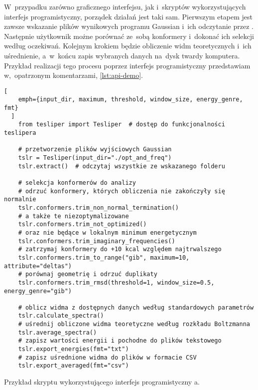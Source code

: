 W~przypadku zarówno graficznego interfejsu, jak i~skryptów wykorzystujących interfejs
  programistyczny, porządek działań jest taki sam.
Pierwszym etapem jest zawsze wskazanie plików wynikowych programu Gaussian i~ich odczytanie
  przez \tesliper{}.
Następnie użytkownik możne porównać ze~sobą konformery i~dokonać ich selekcji według oczekiwań.
Kolejnym krokiem będzie obliczenie widm teoretycznych i~ich uśrednienie, a~w~końcu zapis
  wybranych danych na~dysk twardy komputera.
Przykład realizacji tego procesu poprzez interfejs programistyczny przedstawiam
  w,~opatrzonym komentarzami, \cref{lst:api-demo}.

\begin{listing*}
  \begin{lstlisting}[
    emph={input_dir, maximum, threshold, window_size, energy_genre, fmt}
  ]
    from tesliper import Tesliper  # dostęp do funkcjonalności teslipera
    
    # przetworzenie plików wyjściowych Gaussian
    tslr = Tesliper(input_dir="./opt_and_freq")
    tslr.extract()  # odczytaj wszystkie ze wskazanego folderu
    
    # selekcja konformerów do analizy
    # odrzuć konformery, których obliczenia nie zakończyły się normalnie
    tslr.conformers.trim_non_normal_termination()
    # a także te niezoptymalizowane
    tslr.conformers.trim_not_optimized()
    # oraz nie będące w lokalnym minimum energetycznym
    tslr.conformers.trim_imaginary_frequencies()
    # zatrzymaj konformery do +10 kcal względem najtrwalszego
    tslr.conformers.trim_to_range("gib", maximum=10, attribute="deltas")
    # porównaj geometrię i odrzuć duplikaty
    tslr.conformers.trim_rmsd(threshold=1, window_size=0.5, energy_genre="gib")
    
    # oblicz widma z dostępnych danych według standardowych parametrów
    tslr.calculate_spectra()
    # uśrednij obliczone widma teoretyczne według rozkładu Boltzmanna
    tslr.average_spectra()
    # zapisz wartości energii i pochodne do plików tekstowego
    tslr.export_energies(fmt="txt")
    # zapisz uśrednione widma do plików w formacie CSV
    tslr.export_averaged(fmt="csv")
  \end{lstlisting}
  \caption{Przykład skryptu wykorzystującego interfejs programistyczny \tesliper{}a.}
  \label{lst:api-demo}
\end{listing*}

